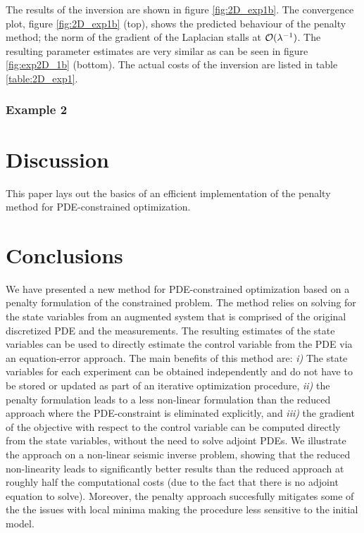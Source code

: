 \documentclass{iopart}
\begin{document}
The results of the inversion are shown in figure \ref{fig:2D_exp1b}. 
The convergence plot, figure \ref{fig:2D_exp1b} (top), shows the predicted behaviour 
of the penalty method; the norm of the gradient of the Laplacian stalls at $\mathcal{O}(\lambda^{-1})$. 
The resulting parameter estimates are very similar as can be seen 
in figure \ref{fig:exp2D_1b} (bottom). The actual costs of the inversion are listed in table \ref{table:2D_exp1}.

\subsubsection{Example 2}


\section{Discussion}
\label{discussion}
This paper lays out the basics of an efficient implementation of the
penalty method for PDE-constrained optimization. 

\section{Conclusions}
\label{conclusion}
We have presented a new method for PDE-constrained optimization based on
a penalty formulation of the constrained problem. The method
relies on solving for the state variables from an augmented system that
is comprised of the original discretized PDE and the measurements. The
resulting estimates of the state variables can be used to directly
estimate the control variable from the PDE via an equation-error
approach. The main benefits of this method are: \emph{i)} The state
variables for each experiment can be obtained independently and do not
have to be stored or updated as part of an iterative optimization
procedure, \emph{ii)} the penalty formulation leads to a less non-linear
formulation than the reduced approach where the PDE-constraint is
eliminated explicitly, and \emph{iii)} the gradient of the objective
with respect to the control variable can be computed directly from the
state variables, without the need to solve adjoint PDEs. We illustrate
the approach on a non-linear seismic inverse problem, showing that the
reduced non-linearity leads to significantly better results than the
reduced approach at roughly half the computational costs (due to the
fact that there is no adjoint equation to solve). Moreover, the penalty
approach succesfully mitigates some of the the issues with local minima
making the procedure less sensitive to the initial model.
\end{document}
